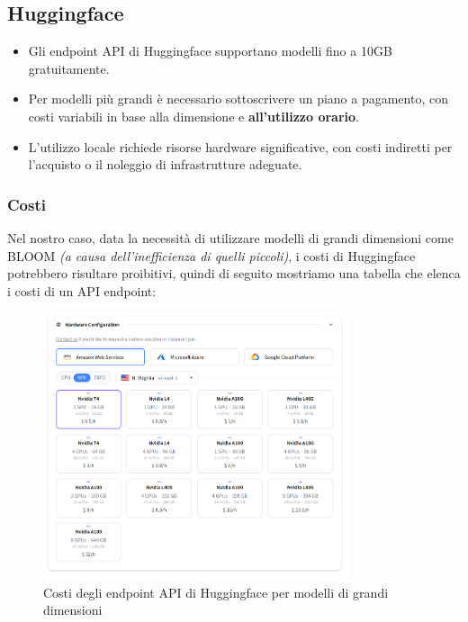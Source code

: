 \documentclass{article}
\begin{document}
\subsection{Huggingface}
\begin{itemize}
    \item Gli endpoint API di Huggingface supportano modelli fino a 10GB gratuitamente.
    \item Per modelli più grandi è necessario sottoscrivere un piano a pagamento, con costi variabili in base alla dimensione e \textbf{all'utilizzo orario}.
    \item L'utilizzo locale richiede risorse hardware significative, con costi indiretti per l'acquisto o il noleggio di infrastrutture adeguate.
\end{itemize}

\subsubsection{Costi}
Nel nostro caso, data la necessità di utilizzare modelli di grandi dimensioni come BLOOM \textit{(a causa dell'inefficienza di quelli piccoli)}, i costi di Huggingface potrebbero risultare proibitivi,
quindi di seguito mostriamo una tabella che elenca i costi di un API endpoint:

\begin{figure}[H]
    \centering
    \includegraphics[width=0.8\textwidth]{img/costi_hugginface_api_endpoint.png}
    \caption{Costi degli endpoint API di Huggingface per modelli di grandi dimensioni}
    \label{fig:costi_hugginface_api_endpoint}
\end{figure}
\end{document}
